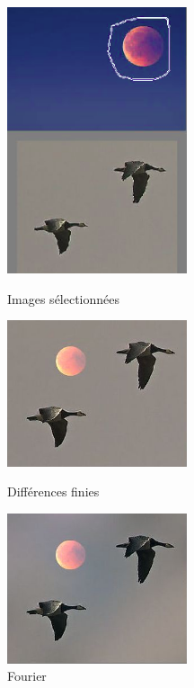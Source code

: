 \begin{figure}[!htb]
   \begin{minipage}{0.33\textwidth}
     \centering
     \includegraphics[width = 150pt]{Images/Resultats/LuneOiseau.png}
     \caption{Images sélectionnées}
      \end{minipage}\hfill
   \begin{minipage}{0.33\textwidth}
     \centering
     \includegraphics[width = 150pt]{Images/Resultats/LuneOiseauD.png}
     \caption{Différences finies}
      \end{minipage}\hfill
   \begin{minipage}{0.33\textwidth}
     \centering
     \includegraphics[width= 150pt]{Images/Resultats/LuneOiseauF.png}
     \caption{Fourier}
   \end{minipage}
\end{figure}


